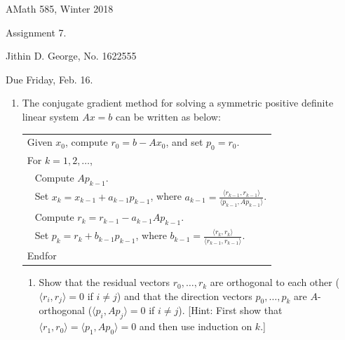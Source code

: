 \documentclass[letterpaper,12pt]{article}
\begin{document}



\noindent
{\scriptsize AMath 585, Winter 2018} \hfill 

\begin{center}
\large
Assignment 7.
\normalsize

Jithin D. George, No. 1622555
\end{center}

\noindent
Due Friday, Feb. 16.
\vspace{.3in}




\noindent

\begin{enumerate}
\item
The conjugate gradient method for solving a symmetric positive definite linear system
$Ax=b$ can be written as below:
\vspace{.1in}

\begin{center}
\begin{tabular}{|l|} \hline
Given $x_0$, compute $r_0 = b - A x_0$, and set $p_0 = r_0$. \\
For $k=1,2, \ldots$, \\
$~~$ Compute $A p_{k-1}$. \\
$~~$ Set $x_k = x_{k-1} + a_{k-1} p_{k-1}$, where $a_{k-1} = \frac{\langle r_{k-1} , r_{k-1} \rangle}
{\langle p_{k-1} , A p_{k-1} \rangle}$. \\
$~~$ Compute $r_k = r_{k-1} - a_{k-1} A p_{k-1}$. \\
$~~$ Set $p_k = r_k + b_{k-1} p_{k-1}$, where $b_{k-1} = \frac{\langle r_k , r_k \rangle}
{\langle r_{k-1} , r_{k-1} \rangle}$. \\
Endfor \\ \hline
\end{tabular}
\end{center}
\vspace{.1in}

\begin{enumerate}
\item
Show that the residual vectors $r_0 , \ldots , r_k$ are orthogonal to each other
($\langle r_i , r_j \rangle = 0$ if $i \neq j$) and that the direction vectors 
 $p_0 , \ldots , p_k$ are $A$-orthogonal ($\langle p_i , A p_j \rangle = 0$ if $i \neq j$).
[Hint:  First show that $\langle r_1 , r_0 \rangle = \langle p_1 , A p_0 \rangle = 0$
and then use induction on $k$.]


\end{enumerate}
\end{enumerate}
\end{document}
